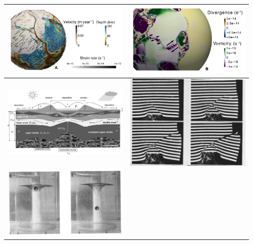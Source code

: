 \begin{tabular}{p{8cm}p{8cm}}
\includegraphics[width=6cm]{images/beautiful/cohf19a} &
\includegraphics[width=6cm]{images/beautiful/cohf19b} \cite{cohf19}  \\ \hline
\includegraphics[width=6cm]{images/beautiful/bucl97} \cite{bucl97} &
\includegraphics[width=6cm]{images/beautiful/peta88} \cite{peta88} \\ \hline
\includegraphics[width=6cm]{images/beautiful/crud88} \cite{crud88} &
\end{tabular}



